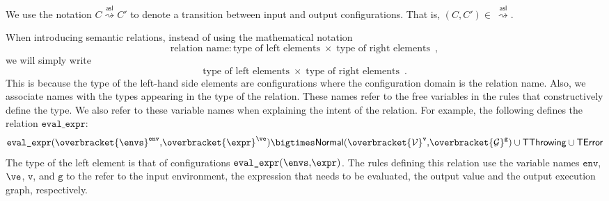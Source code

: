 \documentclass{book}
\newcommand\overname[2]{\overbracket{#1}^{#2}}
\newcommand\XGraphs[0]{\mathcal{G}}
\newcommand\vals[0]{\mathcal{V}}
\newcommand\evalarrow[0]{\stackrel{\mathsf{asl}}{\rightsquigarrow}}
\newcommand\aslrel[0]{\bigtimes}
\newcommand\aslsep[0]{\mathbf{,}}
\newcommand\TError[0]{\textsf{TError}}
\newcommand\TThrowing[0]{\textsf{TThrowing}}
\newcommand\TContinuing[0]{\textsf{TContinuing}}
\newcommand\TReturning[0]{\textsf{TReturning}}
\newcommand\TOutConfig[0]{\textsf{TOutConfig}}
\newcommand\evalexpr[1]{\texttt{eval\_expr}(#1)}
\newcommand\evalcatchers[1]{\texttt{eval\_catchers}(#1)}
\newcommand\evalcall[1]{\texttt{eval\_call}(#1)}
\newcommand\evalspec[1]{\texttt{eval\_spec}(#1)}
\newcommand\Normal[0]{\textsf{Normal}}
\newcommand\env[0]{\texttt{env}}
\newcommand\vg[0]{\texttt{g}}
\newcommand\vv[0]{\texttt{v}}
\begin{document}

  We use the notation $C \evalarrow C'$ to denote a transition between input and output configurations.
  That is, $(C, C') \in\ \evalarrow$.

  When introducing semantic relations, instead of using the mathematical notation
  \[
    \text{relation name} : \text{type of left elements} \;\times\; \text{type of right elements} \enspace,
  \]
  we will simply write
  \[
    \text{type of left elements} \;\times\; \text{type of right elements} \enspace.
  \]
  This is because the type of the left-hand side elements are configurations where the
  configuration domain is the relation name.
  Also, we associate names with the types appearing in the type of the relation.
  These names refer to the free variables in the rules that constructively define the type.
  We also refer to these variable names when explaining the intent of the relation.
  For example, the following defines the relation $\texttt{eval\_expr}$:
  \[
    \evalexpr{\overname{\envs}{\env} \aslsep \overname{\expr}{\ve}} \aslrel \Normal(\overname{\vals}{\vv} \aslsep \overname{\XGraphs}{\vg}) \cup \TThrowing \cup \TError
  \]
  The type of the left element is that of configurations $\evalexpr{\envs \aslsep \expr}$.
  The rules defining this relation use the variable names
  $\env$, $\ve$, $\vv$, and $\vg$ to the refer to the input environment, the expression that needs to be evaluated,
  the output value and the output execution graph, respectively.
\end{document}
